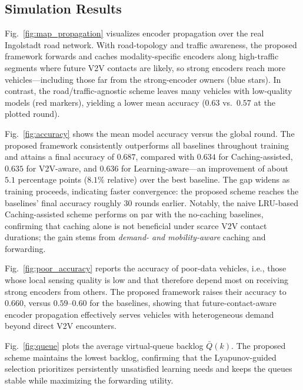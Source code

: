 
\subsection{Simulation Results}
\label{subsec:simulation_results}

Fig.~\ref{fig:map_propagation} visualizes encoder propagation over the real
Ingolstadt road network. With road-topology and traffic awareness, the proposed
framework forwards and caches modality-specific encoders along high-traffic
segments where future V2V contacts are likely, so strong encoders reach more
vehicles---including those far from the strong-encoder owners (blue stars). In
contrast, the road/traffic-agnostic scheme leaves many vehicles with low-quality
models (red markers), yielding a lower mean accuracy ($0.63$ vs.\ $0.57$ at the
plotted round).

Fig.~\ref{fig:accuracy} shows the mean model accuracy versus the global round.
The proposed framework consistently outperforms all baselines throughout
training and attains a final accuracy of $0.687$, compared with $0.634$ for
Caching-assisted, $0.635$ for V2V-aware, and $0.636$ for Learning-aware---an
improvement of about $5.1$ percentage points ($8.1\%$ relative) over the best
baseline. The gap widens as training proceeds, indicating faster convergence:
the proposed scheme reaches the baselines' final accuracy roughly $30$ rounds
earlier. Notably, the naive LRU-based Caching-assisted scheme performs on par
with the no-caching baselines, confirming that caching alone is not beneficial
under scarce V2V contact durations; the gain stems from \emph{demand- and
mobility-aware} caching and forwarding.

Fig.~\ref{fig:poor_accuracy} reports the accuracy of poor-data vehicles, i.e.,
those whose local sensing quality is low and that therefore depend most on
receiving strong encoders from others. The proposed framework raises their
accuracy to $0.660$, versus $0.59$--$0.60$ for the baselines, showing that
future-contact-aware encoder propagation effectively serves vehicles with
heterogeneous demand beyond direct V2V encounters.

Fig.~\ref{fig:queue} plots the average virtual-queue backlog $\bar{Q}(k)$.
The proposed scheme maintains the lowest backlog, confirming that the
Lyapunov-guided selection prioritizes persistently unsatisfied learning needs
and keeps the queues stable while maximizing the forwarding utility.

